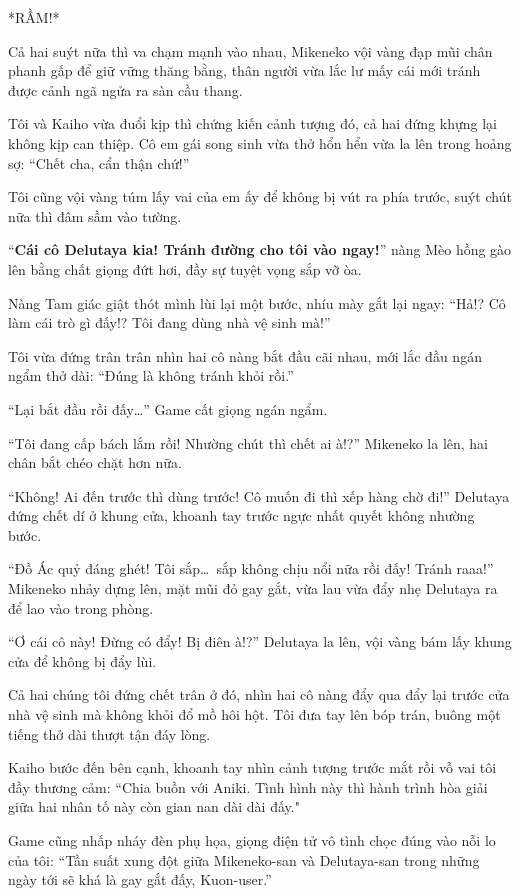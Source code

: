 ﻿\documentclass[../main.tex]{subfiles}
\begin{document}
*RẦM!*

Cả hai suýt nữa thì va chạm mạnh vào nhau, Mikeneko vội vàng đạp mũi chân phanh gấp để giữ vững thăng bằng, thân người vừa lắc lư mấy cái mới tránh được cảnh ngã ngửa ra sàn cầu thang.

Tôi và Kaiho vừa đuổi kịp thì chứng kiến cảnh tượng đó, cả hai đứng khựng lại không kịp can thiệp. Cô em gái song sinh vừa thở hổn hển vừa la lên trong hoảng sợ: ``Chết cha, cẩn thận chứ!''

Tôi cũng vội vàng túm lấy vai của em ấy để không bị vút ra phía trước, suýt chút nữa thì đâm sầm vào tường.

``\textbf{Cái cô Delutaya kia! Tránh đường cho tôi vào ngay!}'' nàng Mèo hồng gào lên bằng chất giọng đứt hơi, đầy sự tuyệt vọng sắp vỡ òa.

Nàng Tam giác giật thót mình lùi lại một bước, nhíu mày gắt lại ngay: ``Hả!? Cô làm cái trò gì đấy!? Tôi đang dùng nhà vệ sinh mà!''

Tôi vừa đứng trân trân nhìn hai cô nàng bắt đầu cãi nhau, mới lắc đầu ngán ngẩm thở dài: ``Đúng là không tránh khỏi rồi.''

``Lại bắt đầu rồi đấy\dots'' Game cất giọng ngán ngẩm.

``Tôi đang cấp bách lắm rồi! Nhường chút thì chết ai à!?'' Mikeneko la lên, hai chân bắt chéo chặt hơn nữa.

``Không! Ai đến trước thì dùng trước! Cô muốn đi thì xếp hàng chờ đi!'' Delutaya đứng chết dí ở khung cửa, khoanh tay trước ngực nhất quyết không nhường bước.

``Đồ Ác quỷ đáng ghét! Tôi sắp\dots\ sắp không chịu nổi nữa rồi đấy! Tránh raaa!'' Mikeneko nhảy dựng lên, mặt mũi đỏ gay gắt, vừa lau vừa đẩy nhẹ Delutaya ra để lao vào trong phòng.

``Ơ cái cô này! Đừng có đẩy! Bị điên à!?'' Delutaya la lên, vội vàng bám lấy khung cửa để không bị đẩy lùi.

Cả hai chúng tôi đứng chết trân ở đó, nhìn hai cô nàng đẩy qua đẩy lại trước cửa nhà vệ sinh mà không khỏi đổ mồ hôi hột. Tôi đưa tay lên bóp trán, buông một tiếng thở dài thượt tận đáy lòng.

Kaiho bước đến bên cạnh, khoanh tay nhìn cảnh tượng trước mắt rồi vỗ vai tôi đầy thương cảm: ``Chia buồn với Aniki. Tình hình này thì hành trình hòa giải giữa hai nhân tố này còn gian nan dài dài đấy."

Game cũng nhấp nháy đèn phụ họa, giọng điện tử vô tình chọc đúng vào nỗi lo của tôi: ``Tần suất xung đột giữa Mikeneko-san và Delutaya-san trong những ngày tới sẽ khá là gay gắt đấy, Kuon-user.''
\end{document}
